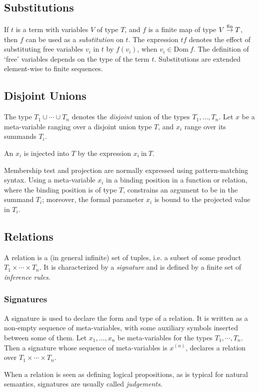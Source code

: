 \subsection{Substitutions}
If $t$ is a term with variables $V$ of type $T$, and $f$
is a finite map of type $V \stackrel{\mathrm{fin}}{\rightarrow} T$, then $f$
can be used as a \emph{substitution} on $t$. The expression $tf$ denotes the
effect of substituting free variables $v_i$ in $t$ by $f(v_i)$,
when $v_i \in \mathrm{Dom}~f$.
The definition of `free' variables depends on the type of the term $t$.
Substitutions are extended element-wise to finite sequences.
%
\subsection{Disjoint Unions}
The type $T_1\cup\cdots\cup T_n$ denotes the \emph{disjoint} union
of the types $T_1,\dots,T_n$. Let $x$ be a meta-variable ranging over
a disjoint union type $T$, and $x_i$ range over its summands $T_i$.

An $x_i$ is injected into $T$ by the expression $x_i~\mathrm{in}~T$.

Membership test and projection are
normally expressed using pattern-matching syntax. Using a meta-variable
$x_i$ in a binding position in a function or relation, where the
binding position is of type $T$, constrains an argument to
be in the summand $T_i$; moreover, the formal parameter $x_i$ is bound
to the projected value in $T_i$.
%
\subsection{Relations}
A relation is a (in general infinite) set of tuples, i.e. a subset
of some product $T_1\times\cdots\times T_n$. It is characterized by
a \emph{signature} and is defined by a finite set of \emph{inference rules}.
%
\subsubsection{Signatures}
A signature is used to declare the form and type of a relation.
It is written as a non-empty sequence of meta-variables, with some auxiliary
symbols inserted between some of them. Let $x_1,\dots,x_n$ be meta-variables
for the types $T_1,\cdots,T_n$. Then a signature whose sequence of
meta-variables is $x^{(n)}$, declares a relation over $T_1\times\cdots\times T_n$.

When a relation is seen as defining logical propositions, as is typical for
natural semantics, signatures are usually called \emph{judgements}.


